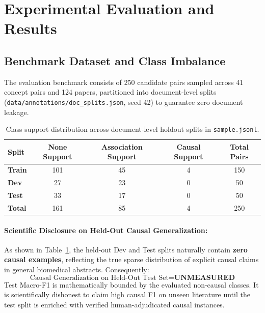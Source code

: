 \documentclass[11pt,a4paper]{article}
\begin{document}
\section{Experimental Evaluation and Results}
\label{sec:experiments}

\subsection{Benchmark Dataset and Class Imbalance}
The evaluation benchmark consists of 250 candidate pairs sampled across 41 concept pairs and 124 papers, partitioned into document-level splits (\texttt{data/annotations/doc\_splits.json}, seed 42) to guarantee zero document leakage.

\begin{table}[htbp]
\centering
\small
\caption{Class support distribution across document-level holdout splits in \texttt{sample.jsonl}.}
\label{tab:split_distribution}
\begin{tabular}{l cccc}
\toprule
\textbf{Split} & \textbf{None Support} & \textbf{Association Support} & \textbf{Causal Support} & \textbf{Total Pairs} \\
\midrule
\textbf{Train} & 101 & 45 & 4 & 150 \\
\textbf{Dev}   & 27  & 23 & 0 & 50 \\
\textbf{Test}  & 33  & 17 & 0 & 50 \\
\midrule
\textbf{Total} & 161 & 85 & 4 & 250 \\
\bottomrule
\end{tabular}
\end{table}

\paragraph{Scientific Disclosure on Held-Out Causal Generalization:}
As shown in Table~\ref{tab:split_distribution}, the held-out Dev and Test splits naturally contain \textbf{zero causal examples}, reflecting the true sparse distribution of explicit causal claims in general biomedical abstracts. Consequently:
\begin{equation}
    \text{Causal Generalization on Held-Out Test Set} = \textbf{UNMEASURED}
\end{equation}
Test Macro-F1 is mathematically bounded by the evaluated non-causal classes. It is scientifically dishonest to claim high causal F1 on unseen literature until the test split is enriched with verified human-adjudicated causal instances.
\end{document}

